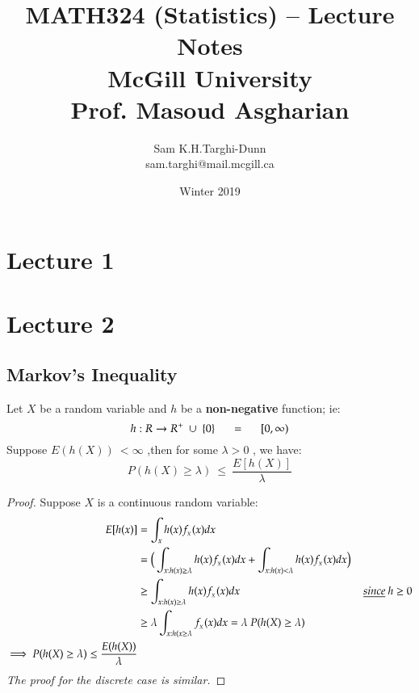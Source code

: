 \documentclass[14pt,twoside,a4paper,fleqn]{article}
\title{MATH324 (Statistics) -- Lecture Notes\\McGill University\\Prof. Masoud Asgharian}
\date{Winter 2019}
\author{Sam K.H.Targhi-Dunn\\sam.targhi@mail.mcgill.ca}
\theoremstyle{plain}
\begin{document}
\maketitle

\newcommand\tab[1][1cm]{\hspace*{#1}}

\tableofcontents
\newpage
\section{Lecture 1}

\newpage
\section{Lecture 2}
\subsection{Markov's Inequality}
Let $X$ be a random variable and $h$ be a \textbf{non-negative} function; ie:
	\begin{equation*}
	h:R->R^{+}\ \cup\ \{0\}\tab[0.5cm]=\tab[0.5cm] [0,\infty)
	\end{equation*}
Suppose $E(h(X))\ < \infty$ ,then for some $\lambda > 0$ , we have:
	\begin{equation}\label{markov}
	P(h(X) \geq \lambda)\ \leq\ \frac{E[h(X)]}{\lambda}
	\end{equation}
\begin{proof}
Suppose $X$ is a continuous random variable:
	\begin{equation*}
	\begin{split}
	E[h(x)] &= \int_{x} h(x)f_{_X}(x)dx \\
		&=\Big(\int_{x:h(x)\geq\lambda}h(x)f_{_X}(x)dx + \int_{x:h(x) < \lambda}h(x)f_{_X}(x)dx\Big) \\
		&\geq \int_{x:h(x)\geq\lambda}h(x)f_{_X}(x)dx\tab[4cm] \underline{since}\ h\geq 0\\
		&\geq\lambda \int_{x:h(x\geq\lambda}f_{_X}(x)dx = \lambda\ P(h(X)\geq \lambda)\\
		\implies P(h(X)\geq \lambda) \leq \frac{E(h(X))}{\lambda}
	\end{split}
	\end{equation*}
\emph{The proof for the discrete case is similar.}
\end{proof} 

\end{document}
